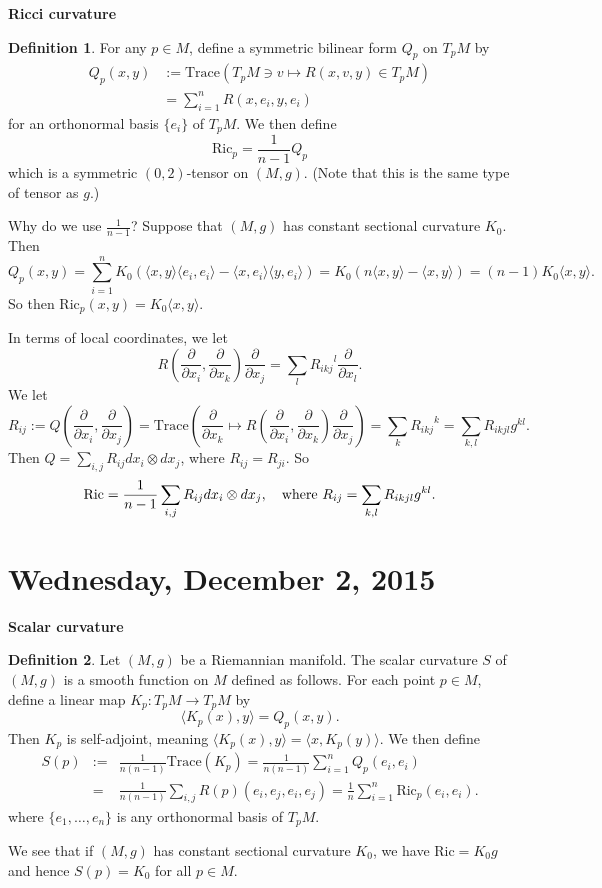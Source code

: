 \documentclass{amsart}
\numberwithin{equation}{section}
\theoremstyle{definition}
\newtheorem{definition}{Definition} [section]
\theoremstyle{theorem}
\begin{document}
\bigskip

\noindent
{\bf \large Ricci curvature}


\begin{definition}
For any $p\in M$,  define a symmetric bilinear form $Q_p$ on $T_p M$ by   
\begin{align*}
Q_p(x,y) &:= \text{Trace}( T_pM \ni v \mapsto R(x,v,y) \in T_pM) \\
&= \sum_{i=1}^n R(x, e_i, y, e_i)
\end{align*}
for an orthonormal basis $\{e_i\}$ of $T_pM$. We then define 
\[
\mathrm{Ric}_p = \frac{1}{n-1}Q_p
\]
which is a symmetric $(0,2)$-tensor on $(M,g)$. (Note that this is the same type of tensor as $g$.)
\end{definition}

Why do we use $\frac{1}{n-1}$? Suppose that $(M,g)$ has constant sectional curvature $K_0$. Then 
$$
Q_p(x,y) = \sum_{i=1}^n K_0 \left(\langle x,y \rangle \langle e_i, e_i \rangle - \langle x, e_i \rangle \langle y, e_i \rangle\right)  
= K_0(n \langle x,y \rangle - \langle x , y \rangle)
= (n-1)K_0 \langle x,y \rangle.
$$
So then $\mathrm{Ric}_p(x,y) = K_0 \langle x, y\rangle$. 


In terms of local coordinates, we let 
\[
R(\frac{\partial}{\partial x_i}, \frac{\partial}{\partial x_k})\frac{\partial}{\partial x_j} = \sum_{l} {R_{ikj}}^l \frac{\partial}{\partial x_l}. 
\]
We let 
$$
R_{ij} := Q(\frac{\partial}{\partial x_i},\frac{\partial}{\partial x_j}) 
= \text{Trace}(\frac{\partial}{\partial x_k} \mapsto R(\frac{\partial}{\partial x_i}, \frac{\partial}{\partial x_k})\frac{\partial}{\partial x_j}) 
= \sum_{k} {R_{ikj}}^k 
= \sum_{k,l} R_{ikjl}g^{kl}.
$$
Then $Q = \sum_{i,j}R_{ij} dx_i \otimes dx_j$, where $R_{ij} = R_{ji}$. So 
$$
\mathrm{Ric} = \frac{1}{n-1} \sum_{i,j} R_{ij} dx_i \otimes dx_j,\quad
\textup{where } R_{ij} = \sum_{k,l}R_{ikjl}g^{kl}.
$$


\section{Wednesday, December 2, 2015}

\noindent
{\bf \large Scalar curvature}


\begin{definition} Let $(M,g)$ be a  Riemannian manifold. The scalar curvature
$S$ of $(M,g)$ is a smooth function on $M$ defined as follows. 
For each point $p \in M$, define a linear map $K_p : T_pM \to T_pM$ by 
\[
\langle K_p(x), y \rangle = Q_p(x,y).
\]
Then $K_p$ is self-adjoint, meaning $\langle K_p(x),y\rangle = \langle x, K_p(y)\rangle$. We then define 
\begin{eqnarray*}
S(p) &:=& \frac{1}{n(n-1)} \text{Trace}(K_p) 
= \frac{1}{n(n-1)} \sum_{i=1}^n Q_p(e_i, e_i) \\
&=& \frac{1}{n(n-1)} \sum_{i,j} R(p)(e_i, e_j, e_i, e_j) 
= \frac{1}{n} \sum_{i=1}^n \text{Ric}_p(e_i, e_i). 
\end{eqnarray*}
where $\{ e_1,\ldots, e_n\}$ is any orthonormal basis of $T_pM$. 
\end{definition}
We see that if $(M,g)$ has constant sectional curvature $K_0$, we have $\text{Ric} = K_0 g$ and hence $S(p) = K_0$
for all $p\in M$. 
\end{document}
